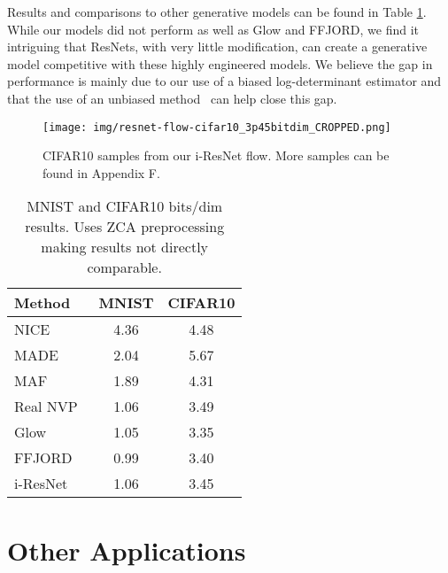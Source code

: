 \documentclass{article}
\begin{document}
Results and comparisons to other generative models can be found in Table \ref{tab:bitdim}. While our models did not perform as well as Glow and FFJORD, we find it intriguing that ResNets, with very little modification, can create a generative model competitive with these highly engineered models. We believe the gap in performance is mainly due to our use of a biased log-determinant estimator and that the use of an unbiased method~\cite{HanGradients} can help close this gap.  

\begin{figure}
    \centering
    \texttt{[image: img/resnet-flow-cifar10\_3p45bitdim\_CROPPED.png]}
    \caption{CIFAR10 samples from our i-ResNet flow. More samples can be found in Appendix F.}
    \label{fig:cifar_samples}
\end{figure}

\begin{table}
\begin{tabular}{@{}l|cc@{}}Method & MNIST & CIFAR10 \\
\midrule
NICE~\citep{dinh2014nice} & 4.36 & 4.48\\
MADE~\citep{MADE} & 2.04 & 5.67 \\
MAF~\citep{MAF}  & 1.89 & 4.31 \\
Real NVP~\citep{dinh2016density} & 1.06 & 3.49 \\
Glow~\citep{kingma2018glow} & 1.05 & 3.35 \\
FFJORD~\citep{ffjord} & 0.99 & 3.40 \\
\midrule
i-ResNet & 1.06 & 3.45 \end{tabular}
\caption{MNIST and CIFAR10 bits/dim results.   Uses ZCA preprocessing making results not directly comparable.}
\label{tab:bitdim}
\end{table}



\section{Other Applications}
\end{document}
